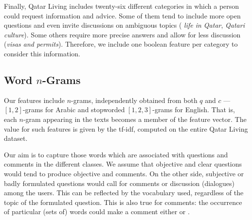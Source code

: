 Finally, Qatar Living includes twenty-six different categories in which a person 
could request information and advice. Some of them tend to include more 
open questions and even invite discussions on ambiguous topics (\eg
\textit{life in Qatar}, \textit{Qatari culture}). Some others require more 
precise answers and allow for less discussion (\eg \textit{visas and permits}). 
Therefore, we include one boolean feature per category to consider this 
information. 
 
\subsection{Word $n$-Grams}
\label{ssub:ngrams}

Our features include $n$-grams, independently obtained from both $q$ and $c$ 
---$[1,2]$-grams for Arabic and stopworded $[1,2,3]$-grams for English. That is, 
each $n$-gram appearing in the texts becomes a member of the feature vector. 
The value for such features is given by the tf-idf, computed on the entire Qatar 
Living dataset.

Our aim is to capture those words which are associated with questions and comments 
in the different classes. We assume that objective and clear questions would tend to produce objective and \good comments. On the other side, subjective or badly formulated 
questions would call for \bad comments or discussion (\ie dialogues) among 
the users. This can be reflected by the vocabulary used, regardless of the topic of the formulated question. This is also true for comments: the occurrence of particular (sets of) words could make a comment either \good or \bad.
 
%

